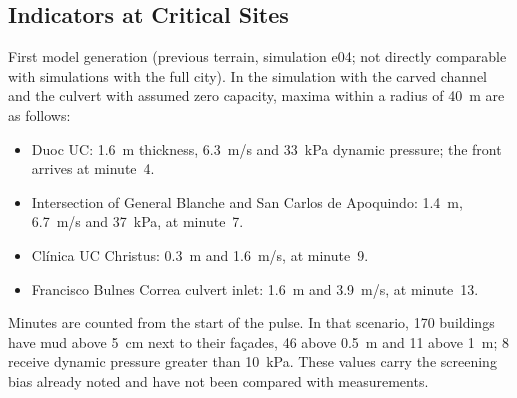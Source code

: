 \subsection{Indicators at Critical Sites}\label{sec:res-indicadores}
First model generation (previous terrain, simulation e04; not directly comparable with simulations with the full city). In the simulation with the carved channel and the culvert with assumed zero capacity, maxima within a radius of \SI{40}{m} are as follows:
\begin{itemize}
\item Duoc UC: \SI{1.6}{m} thickness, \SI{6.3}{m/s} and \SI{33}{kPa} dynamic pressure; the front arrives at minute~4.
\item Intersection of General Blanche and San Carlos de Apoquindo: \SI{1.4}{m}, \SI{6.7}{m/s} and \SI{37}{kPa}, at minute~7.
\item Clínica UC Christus: \SI{0.3}{m} and \SI{1.6}{m/s}, at minute~9.
\item Francisco Bulnes Correa culvert inlet: \SI{1.6}{m} and \SI{3.9}{m/s}, at minute~13.
\end{itemize}
Minutes are counted from the start of the pulse. In that scenario, 170 buildings have mud above \SI{5}{cm} next to their façades, 46 above \SI{0.5}{m} and 11 above \SI{1}{m}; 8 receive dynamic pressure greater than \SI{10}{kPa}. These values carry the screening bias already noted and have not been compared with measurements.

